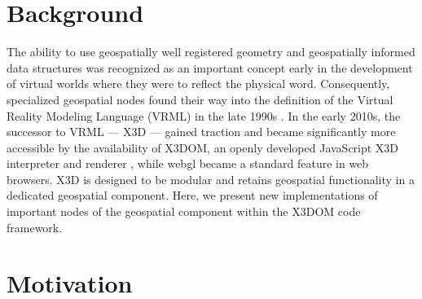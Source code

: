 \documentclass{acmsiggraph}                     %
\begin{document}

\begin{CRcatlist}
\end{CRcatlist}

\keywordlist

\section{Background}

\copyrightspace

The ability to use geospatially well registered geometry and geospatially informed data structures was recognized as an important concept early in the development of virtual worlds where they were to reflect the physical word. Consequently, specialized geospatial nodes found their way into the definition of the Virtual Reality Modeling Language (VRML) in the late 1990s \cite{reddy2000}. In the early 2010s, the successor to VRML --- X3D --- gained traction and became significantly more accessible by the availability of X3DOM, an openly developed JavaScript X3D interpreter and renderer \cite{behr09}, while webgl became a standard feature in web browsers. X3D is designed to be modular \cite{x3d05} and retains geospatial functionality in a dedicated geospatial component. Here, we present new implementations of important nodes of the geospatial component within the X3DOM code framework.


\section{Motivation}
\end{document}
